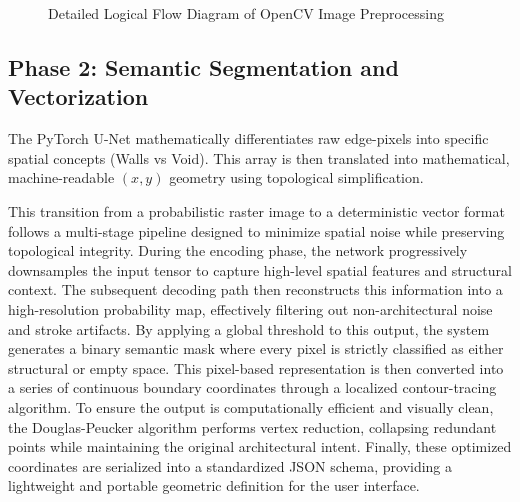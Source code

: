 \documentclass[12pt]{report}
\begin{document}
\begin{figure}[H]
\centering
{}
\caption{Detailed Logical Flow Diagram of OpenCV Image Preprocessing\cite{opencv2024, canny1986}}
\label{fig:preprocessing}
\end{figure}

\subsection{Phase 2: Semantic Segmentation and Vectorization}

The PyTorch U-Net\cite{ronneberger2015} mathematically differentiates raw edge-pixels into specific spatial concepts (Walls vs Void). This array is then translated into mathematical, machine-readable $(x,y)$ geometry using topological simplification\cite{liu2017, douglas1973}.

This transition from a probabilistic raster image to a deterministic vector format follows a multi-stage pipeline designed to minimize spatial noise while preserving topological integrity. 
During the encoding phase, the network progressively downsamples the input tensor to capture high-level spatial features and structural context. The subsequent decoding path then reconstructs this information into a high-resolution probability map, effectively filtering out non-architectural noise and stroke artifacts. By applying a global threshold to this output, the system generates a binary semantic mask where every pixel is strictly classified as either structural or empty space. This pixel-based representation is then converted into a series of continuous boundary coordinates through a localized contour-tracing algorithm. To ensure the output is computationally efficient and visually clean, the Douglas-Peucker algorithm performs vertex reduction, collapsing redundant points while maintaining the original architectural intent. Finally, these optimized coordinates are serialized into a standardized JSON schema, providing a lightweight and portable geometric definition for the user interface.
\end{document}
